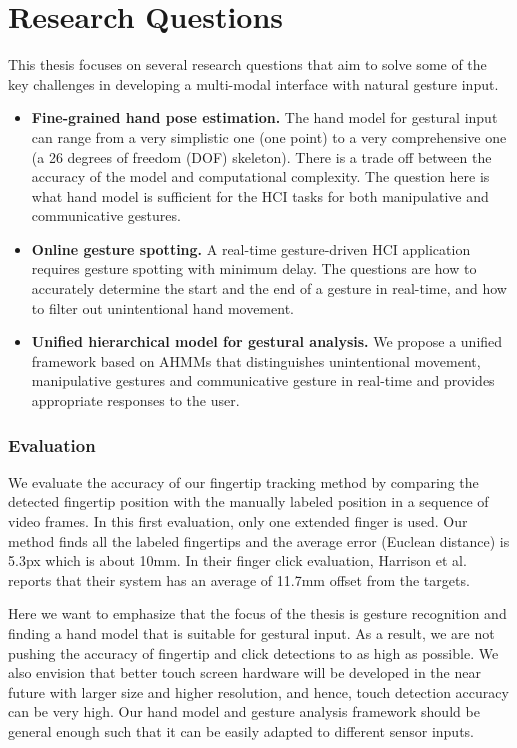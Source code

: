 \section{Research Questions}
This thesis focuses on several research questions that aim to solve some of the
key challenges in developing a multi-modal interface with natural gesture input.

\begin{itemize}
  \item \textbf{Fine-grained hand pose estimation.} The hand model for
  gestural input can range from a very simplistic one (one point) to a very
  comprehensive one (a 26 degrees of freedom (DOF) skeleton). There is a trade
  off between the accuracy of the model and computational complexity. The question
  here is what hand model is sufficient for the HCI tasks for both manipulative
  and communicative gestures.
  \item \textbf{Online gesture spotting.} A real-time gesture-driven HCI
  application requires gesture spotting with minimum delay. The questions are how to accurately determine the
  start and the end of a gesture in real-time, and how to filter out
  unintentional hand movement.
  \item \textbf{Unified hierarchical model for gestural analysis.} We propose a
  unified framework based on AHMMs that distinguishes unintentional movement,
  manipulative gestures and communicative gesture in real-time and provides
  appropriate responses to the user.
\end{itemize}

\subsubsection{Evaluation}
We evaluate the accuracy of our fingertip tracking method by comparing the
detected fingertip position with the manually labeled position in a sequence of
video frames. In this first evaluation, only one extended finger is used. Our
method finds all the labeled fingertips and the average error (Euclean distance)
is 5.3px which is about 10mm. In their finger click evaluation, Harrison et al.
reports that their system has an average of 11.7mm offset from the targets. 

Here we want to emphasize that the focus of the thesis is gesture recognition
and finding a hand model that is suitable for gestural input. As a result, we
are not pushing the accuracy of fingertip and click detections to as high as
possible. We also envision that better touch screen hardware will be developed
in the near future with larger size and higher resolution, and hence, touch
detection accuracy can be very high. Our hand model and gesture analysis
framework should be general enough such that it can be easily adapted to
different sensor inputs.

